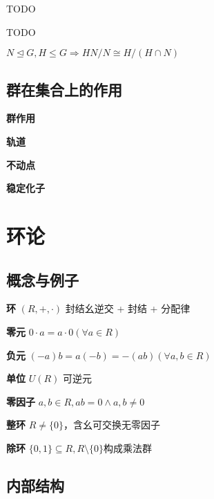 \documentclass[a4paper,10pt]{ctexart}
\newcommand*{\impl}{\Rightarrow}
\renewcommand*{\leq}{\leqslant}
\newcommand*{\nmsubgroupeq}{\trianglelefteq}
\begin{document}
\begin{multicols}{3}
    \begin{theorem}[子群对应定理]
        TODO
    \end{theorem}

    \begin{theorem}
        TODO
    \end{theorem}

    \begin{theorem}
        \hfil

        $N \nmsubgroupeq G, H \leq G \impl HN/N \cong H/(H \cap N)$
    \end{theorem}

    \subsection{群在集合上的作用}

    \textbf{群作用}

    \textbf{轨道}

    \textbf{不动点}

    \textbf{稳定化子}

    \begin{theorem}[Burnside 引理]

    \end{theorem}

    \section{环论}

    \subsection{概念与例子}

    \textbf{环} $(R, +, \cdot)$ 封结幺逆交 + 封结 + 分配律

    \textbf{零元} $0 \cdot a = a \cdot 0 (\forall a \in R)$

    \textbf{负元} $(-a)b = a(-b) = -(ab) (\forall a, b \in R)$

    \textbf{单位} $U(R)$ 可逆元

    \textbf{零因子} $a, b \in R, ab = 0 \wedge a, b \ne 0$

    \textbf{整环} $R\ne \{0\}$，含幺可交换无零因子

    \textbf{除环} $\{0, 1\} \subseteq R, R \setminus \{0\}$构成乘法群

    \subsection{内部结构}


\end{multicols}
\end{document}
